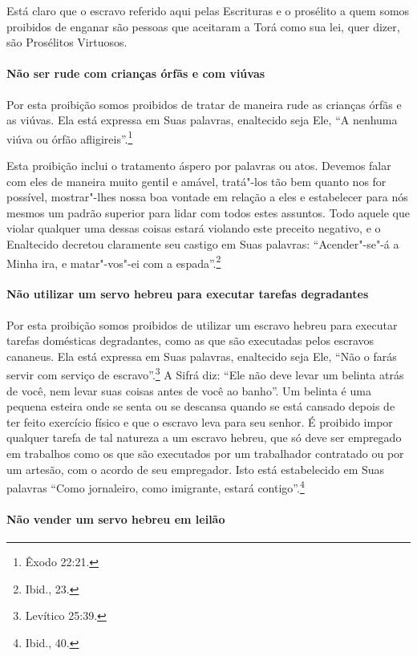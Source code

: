 \begin{multicols}{2}
Está claro que o escravo referido aqui pelas Escrituras e o prosélito a
quem somos proibidos de enganar são pessoas que aceitaram a Torá\starr{} como
sua lei, quer dizer, são Prosélitos Virtuosos.

\paragraph{Não ser rude com crianças órfãs e com viúvas}

Por esta proibição somos proibidos de tratar de maneira rude as
crianças órfãs e as viúvas. Ela está expressa em Suas palavras,
enaltecido seja Ele, ``A nenhuma viúva ou órfão afligireis''.\footnote{Êxodo
22:21.}


Esta proibição inclui o tratamento áspero por palavras ou atos. Devemos
falar com eles de maneira muito gentil e amável, tratá"-los tão bem
quanto nos for possível, mostrar"-lhes nossa boa vontade em relação a
eles e estabelecer para nós mesmos um padrão superior para lidar com
todos estes assuntos. Todo aquele que violar qualquer uma dessas coisas
estará violando este preceito negativo, e o Enaltecido decretou
claramente seu castigo em Suas palavras: ``Acender"-se"-á a Minha ira, e
matar"-vos"-ei com a espada''.\footnote{Ibid., 23.}

\paragraph{Não utilizar um servo hebreu para executar tarefas degradantes}

Por esta proibição somos proibidos de utilizar um escravo hebreu para
executar tarefas domésticas degradantes, como as que são executadas
pelos escravos cananeus. Ela está expressa em Suas palavras, enaltecido
seja Ele, ``Não o farás servir com serviço de escravo''.\footnote{Levítico
25:39.} A Sifrá\starr{} diz: ``Ele não deve levar um belinta\starr{} atrás de você,
nem levar suas coisas antes de você ao banho''. Um belinta\starr{} é uma
pequena esteira onde se senta ou se descansa quando se está cansado
depois de ter feito exercício físico e que o escravo leva para seu
senhor. É proibido impor qualquer tarefa de tal natureza a um escravo
hebreu, que só deve ser empregado em trabalhos como os que são
executados por um trabalhador contratado ou por um artesão, com o acordo
de seu empregador. Isto está estabelecido em Suas palavras ``Como
jornaleiro, como imigrante, estará contigo''.\footnote{Ibid., 40.}

\paragraph{Não vender um servo hebreu em leilão}


\end{multicols}
